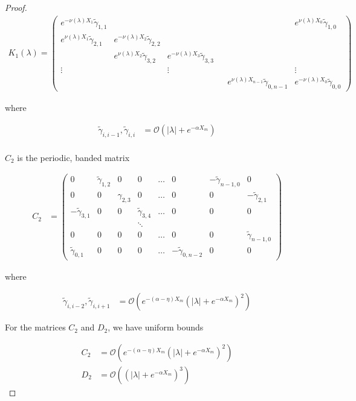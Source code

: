 \documentclass[thesis.tex]{subfiles}
\begin{document}
\begin{lemma}
\begin{proof}
\begin{align*}
K_1(\lambda) =  
\begin{pmatrix}
e^{-\nu(\lambda)X_1} \tilde{\gamma}_{1,1} & & & & & e^{\nu(\lambda)X_0}\tilde{\gamma}_{1,0} \\
e^{\nu(\lambda)X_1}\tilde{\gamma}_{2,1} & e^{-\nu(\lambda)X_2}\tilde{\gamma}_{2,2} \\
& e^{\nu(\lambda)X_2}\tilde{\gamma}_{3,2} & e^{-\nu(\lambda)X_3}\tilde{\gamma}_{3,3} \\
\vdots & & \vdots & &&  \vdots \\
& & & & e^{\nu(\lambda)X_{n-1}}\tilde{\gamma}_{0,n-1} & e^{-\nu(\lambda)X_0}\tilde{\gamma}_{0,0} 
\end{pmatrix}
\end{align*}

where 

\begin{align*}
\tilde{\gamma}_{i,i-1}, \tilde{\gamma}_{i,i} &= \mathcal{O}(|\lambda| + e^{-\alpha X_m}) \\
\end{align*}

$C_2$ is the periodic, banded matrix

\begin{align*}
C_2 &= \begin{pmatrix}
0 & \tilde{\gamma}_{1,2} & 0 & 0 & \dots & 0 & -\tilde{\gamma}_{n-1,0} & 0 \\
0 & 0 & \gamma_{2,3} & 0 & \dots & 0 & 0 & -\tilde{\gamma}_{2,1} \\
-\tilde{\gamma}_{3,1} & 0 & 0 & \tilde{\gamma}_{3,4} & \dots & 0 & 0 & 0 \\
&  & & \ddots  \\
0 & 0 & 0 & 0 & \dots & 0 & 0 & \tilde{\gamma}_{n-1,0} \\
\tilde{\gamma}_{0,1} & 0 & 0 & 0 & \dots & -\tilde{\gamma}_{0, n-2} & 0 & 0 
\end{pmatrix}
\end{align*}

where

\begin{align*}
\tilde{\gamma}_{i,i-2}, \tilde{\gamma}_{i,i+1} &= \mathcal{O}(e^{-(\alpha - \eta) X_m}(|\lambda| + e^{-\alpha X_m})^2) 
\end{align*}

For the matrices $C_2$ and $D_2$, we have uniform bounds

\begin{align*}
C_2 &= \mathcal{O}(e^{-(\alpha - \eta) X_m}(|\lambda| + e^{-\alpha X_m})^2) \\
D_2 &= \mathcal{O}((|\lambda| + e^{-\alpha X_m})^3)
\end{align*}

\end{proof}
\end{lemma}
\end{document}
